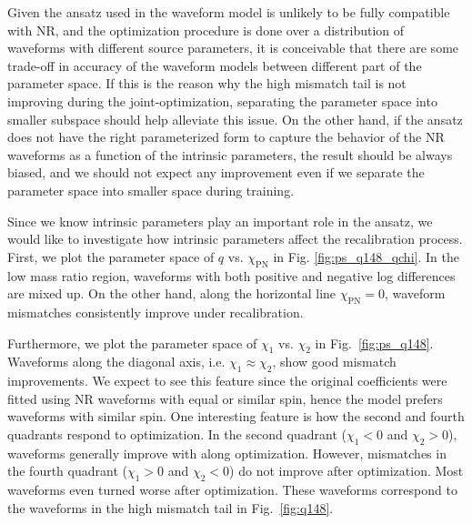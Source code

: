\documentclass[twocolumn]{aastex631}
\begin{document}

Given the ansatz used in the waveform model is unlikely to be fully compatible with NR, and the optimization procedure is done over a distribution of waveforms with different source parameters, it is conceivable that there are some trade-off in accuracy of the waveform models between different part of the parameter space. If this is the reason why the high mismatch tail is not improving during the joint-optimization, separating the parameter space into smaller subspace should help alleviate this issue. On the other hand, if the ansatz does not have the right parameterized form to capture the behavior of the NR waveforms as a function of the intrinsic parameters, the result should be always biased, and we should not expect any improvement even if we separate the parameter space into smaller space during training.

Since we know intrinsic parameters play an important role in the ansatz, we would like to investigate how intrinsic parameters affect the recalibration process. First, we plot the parameter space of $q$ vs. $\chi_{\mathrm{PN}}$ in Fig. \ref{fig:ps_q148_qchi}. In the low mass ratio region, waveforms with both positive and negative log differences are mixed up. On the other hand, along the horizontal line $\chi_{\mathrm{PN}}=0$, waveform mismatches consistently improve under recalibration. 

Furthermore, we plot the parameter space of $\chi_1$ vs. $\chi_2$ in Fig.~\ref{fig:ps_q148}. Waveforms along the diagonal axis, i.e. $\chi_1\approx\chi_2$, show good mismatch improvements. We expect to see this feature since the original coefficients were fitted using NR waveforms with equal or similar spin, hence the model prefers waveforms with similar spin. One interesting feature is how the second and fourth quadrants respond to optimization. In the second quadrant ($\chi_1<0$ and $\chi_2>0$), waveforms generally improve with along optimization. However, mismatches in the fourth quadrant ($\chi_1>0$ and $\chi_2<0$) do not improve after optimization. Most waveforms even turned worse after optimization. These waveforms correspond to the waveforms in the high mismatch tail in Fig.~\ref{fig:q148}. 
\end{document}
